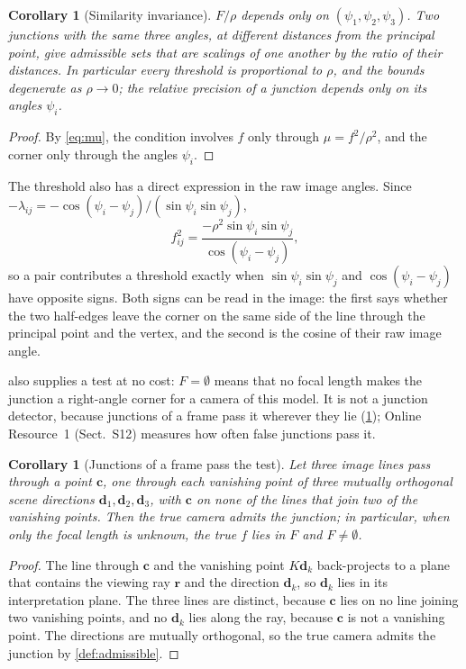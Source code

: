 \documentclass[pdflatex,sn-mathphys-num,iicol]{sn-jnl}
\newcommand{\vd}{\mathbf{d}}
\newcommand{\vr}{\mathbf{r}}
\newcommand{\vc}{\mathbf{c}}
\newcommand{\OR}{Online Resource~1}
\theoremstyle{thmstyleone}
\newtheorem{corollary}[theorem]{Corollary}
\theoremstyle{thmstylethree}
\theoremstyle{thmstyletwo}
\begin{document}
\begin{corollary}[Similarity invariance]\label{cor:similar}
$F/\rho$ depends only on $(\psi_1,\psi_2,\psi_3)$. Two junctions with the same three angles, at different distances from the principal point, give admissible sets that are scalings of one another by the ratio of their distances. In particular every threshold is proportional to $\rho$, and the bounds degenerate as $\rho\to0$; the relative precision of a junction depends only on its angles $\psi_i$.
\end{corollary}
\begin{proof}
By \eqref{eq:mu}, the condition involves $f$ only through $\mu=f^2/\rho^2$, and the corner only through the angles $\psi_i$.
\end{proof}

The threshold also has a direct expression in the raw image angles. Since $-\lambda_{ij}=-\cos(\psi_i-\psi_j)/(\sin\psi_i\sin\psi_j)$,
\begin{equation}
f_{ij}^2=\frac{-\rho^2\sin\psi_i\sin\psi_j}{\cos(\psi_i-\psi_j)},
\label{eq:thresh}
\end{equation}
so a pair contributes a threshold exactly when $\sin\psi_i\sin\psi_j$ and $\cos(\psi_i-\psi_j)$ have opposite signs. Both signs can be read in the image: the first says whether the two half-edges leave the corner on the same side of the line through the principal point and the vertex, and the second is the cosine of their raw image angle.

 also supplies a test at no cost: $F=\emptyset$ means that no focal length makes the junction a right-angle corner for a camera of this model. It is not a junction detector, because junctions of a frame pass it wherever they lie (\cref{cor:framepass}); \OR{} (Sect.~S12) measures how often false junctions pass it.

\begin{corollary}[Junctions of a frame pass the test]\label{cor:framepass}
Let three image lines pass through a point $\vc$, one through each vanishing point of three mutually orthogonal scene directions $\vd_1,\vd_2,\vd_3$, with $\vc$ on none of the lines that join two of the vanishing points. Then the true camera admits the junction; in particular, when only the focal length is unknown, the true $f$ lies in $F$ and $F\neq\emptyset$.
\end{corollary}
\begin{proof}
The line through $\vc$ and the vanishing point $K\vd_k$ back-projects to a plane that contains the viewing ray $\vr$ and the direction $\vd_k$, so $\vd_k$ lies in its interpretation plane. The three lines are distinct, because $\vc$ lies on no line joining two vanishing points, and no $\vd_k$ lies along the ray, because $\vc$ is not a vanishing point. The directions are mutually orthogonal, so the true camera admits the junction by \cref{def:admissible}.
\end{proof}
\end{document}
